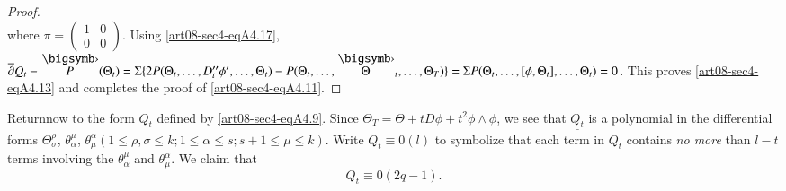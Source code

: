\begin{proof}
\begin{equation*}
\end{equation*}
where $\pi=\left(\begin{smallmatrix} 1 & 0\\ 0 & 0\end{smallmatrix}\right)$. Using \eqref{art08-sec4-eqA4.17}, $\overline{\partial}Q_{t}-\overdot{P}(\Theta_{t})=\Sigma\{2P(\Theta_{t},\ldots,D''_{t}\phi',\break \ldots,\Theta_{t})-P(\Theta_{t},\ldots,\overdot{\Theta}_{t},\ldots,\Theta_{T})\}=\Sigma P(\Theta_{t},\ldots,[\phi,\Theta_{t}],\ldots,\Theta_{t})=0$. This proves \eqref{art08-sec4-eqA4.13} and completes the proof of \eqref{art08-sec4-eqA4.11}.
\end{proof}

Return\pageoriginale now to the form $Q_{t}$ defined by \eqref{art08-sec4-eqA4.9}. Since $\Theta_{T}=\Theta+tD\phi+t^{2}\phi\wedge \phi$, we see that $\underline{Q_{t}}$ is a polynomial in the differential forms $\Theta^{\rho}_{\sigma}$, $\theta^{\mu}_{\alpha}$, $\theta^{\alpha}_{\mu}(1\leq \rho, \sigma\leq k; 1\leq \alpha\leq s;s+1\leq \mu\leq k)$. Write $Q_{t}\equiv 0(l)$ to symbolize that each term in $Q_{t}$ contains {\em no more} than $l-t$ terms involving the $\theta^{\mu}_{\alpha}$ and $\theta^{\alpha}_{\mu}$. We claim that
\begin{equation*}
Q_{t}\equiv 0(2q-1).\tag{A4.18}\label{art08-sec4-eqA4.18}
\end{equation*}

